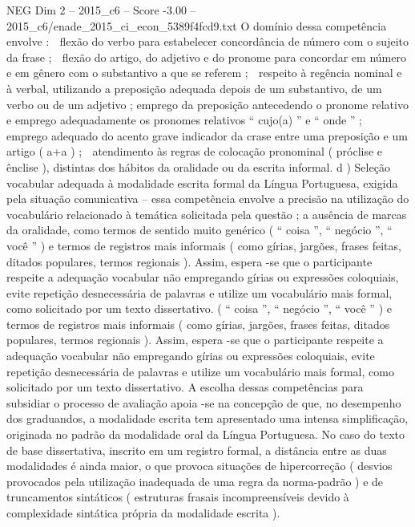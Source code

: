 \begin{textsample}{NEG Dim 2 – 2015\_c6 – Score -3.00 – 2015\_c6/enade\_2015\_ci\_econ\_5389f4fcd9.txt}
O domínio dessa competência envolve :  flexão do verbo para estabelecer concordância de número com o sujeito da frase ;  flexão do artigo, do adjetivo e do pronome para concordar em número e em gênero com o substantivo a que se referem ;  respeito à regência nominal e à verbal, utilizando a preposição adequada depois de um substantivo, de um verbo ou de um adjetivo ; emprego da preposição antecedendo o pronome relativo e emprego adequadamente os pronomes relativos “ cujo(a) ” e “ onde ” ;  emprego adequado do acento grave indicador da crase entre uma preposição e um artigo ( a+a ) ;  atendimento às regras de colocação pronominal ( próclise e ênclise ), distintas dos hábitos da oralidade ou da escrita informal. d ) Seleção vocabular adequada à modalidade escrita formal da Língua Portuguesa, exigida pela situação comunicativa – essa competência envolve a precisão na utilização do vocabulário relacionado à temática solicitada pela questão ; a ausência de marcas da oralidade, como termos de sentido muito genérico ( “ coisa ”, “ negócio ”, “ você ” ) e termos de registros mais informais ( como gírias, jargões, frases feitas, ditados populares, termos regionais ).
Assim, espera -se que o participante respeite a adequação vocabular não empregando gírias ou expressões coloquiais, evite repetição desnecessária de palavras e utilize um vocabulário mais formal, como solicitado por um texto dissertativo. ( “ coisa ”, “ negócio ”, “ você ” ) e termos de registros mais informais ( como gírias, jargões, frases feitas, ditados populares, termos regionais ).
Assim, espera -se que o participante respeite a adequação vocabular não empregando gírias ou expressões coloquiais, evite repetição desnecessária de palavras e utilize um vocabulário mais formal, como solicitado por um texto dissertativo.
A escolha dessas competências para subsidiar o processo de avaliação apoia -se na concepção de que, no desempenho dos graduandos, a modalidade escrita tem apresentado uma intensa simplificação, originada no padrão da modalidade oral da Língua Portuguesa.
No caso do texto de base dissertativa, inscrito em um registro formal, a distância entre as duas modalidades é ainda maior, o que provoca situações de hipercorreção ( desvios provocados pela utilização inadequada de uma regra da norma-padrão ) e de truncamentos sintáticos ( estruturas frasais incompreensíveis devido à complexidade sintática própria da modalidade escrita ).

\end{textsample}
